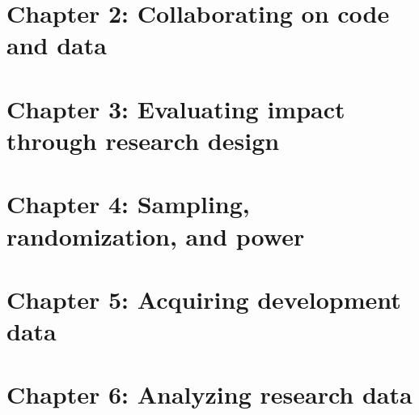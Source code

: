\chapter{Chapter 2: Collaborating on code and data}
\label{ch:2}




\chapter{Chapter 3: Evaluating impact through research design}
\label{ch:3}




\chapter{Chapter 4: Sampling, randomization, and power}
\label{ch:4}




\chapter{Chapter 5: Acquiring development data}
\label{ch:5}




\chapter{Chapter 6: Analyzing research data}
\label{ch:6}




